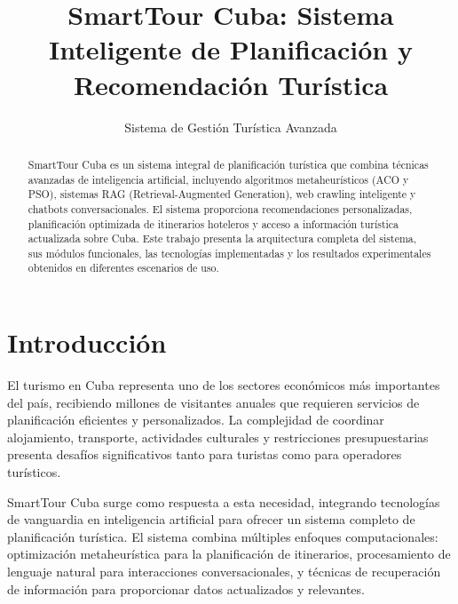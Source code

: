 \documentclass[runningheads]{llncs}
\begin{document}
\title{SmartTour Cuba: Sistema Inteligente de Planificación y Recomendación Turística}

\author{Sistema de Gestión Turística Avanzada}



\maketitle

\begin{abstract}
SmartTour Cuba es un sistema integral de planificación turística que combina técnicas avanzadas de inteligencia artificial, incluyendo algoritmos metaheurísticos (ACO y PSO), sistemas RAG (Retrieval-Augmented Generation), web crawling inteligente y chatbots conversacionales. El sistema proporciona recomendaciones personalizadas, planificación optimizada de itinerarios hoteleros y acceso a información turística actualizada sobre Cuba. Este trabajo presenta la arquitectura completa del sistema, sus módulos funcionales, las tecnologías implementadas y los resultados experimentales obtenidos en diferentes escenarios de uso.

\end{abstract}

\section{Introducción}

El turismo en Cuba representa uno de los sectores económicos más importantes del país, recibiendo millones de visitantes anuales que requieren servicios de planificación eficientes y personalizados. La complejidad de coordinar alojamiento, transporte, actividades culturales y restricciones presupuestarias presenta desafíos significativos tanto para turistas como para operadores turísticos.

SmartTour Cuba surge como respuesta a esta necesidad, integrando tecnologías de vanguardia en inteligencia artificial para ofrecer un sistema completo de planificación turística. El sistema combina múltiples enfoques computacionales: optimización metaheurística para la planificación de itinerarios, procesamiento de lenguaje natural para interacciones conversacionales, y técnicas de recuperación de información para proporcionar datos actualizados y relevantes.
\end{document}
